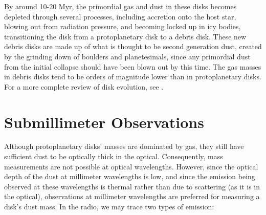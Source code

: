 By around 10-20 Myr, the primordial gas and dust in these disks becomes depleted through several processes, including accretion onto the host star, blowing out from radiation pressure, and becoming locked up in icy bodies, transitioning the disk from a protoplanetary disk to a debris disk. These new debris disks are made up of what is thought to be second generation dust, created by the grinding down of boulders and planetesimals, since any primordial dust from the initial collapse should have been blown out by this time. The gas masses in debris disks tend to be orders of magnitude lower than in protoplanetary disks. For a more complete review of disk evolution, see \citet{Hughes2018}.




\section{Submillimeter Observations}

Although protoplanetary disks' masses are dominated by gas, they still have sufficient dust to be optically thick in the optical. Consequently, mass measurements are not possible at optical wavelengths. However, since the optical depth of the dust at millimeter wavelengths is low, and since the emission being observed at these wavelengths is thermal rather than due to scattering (as it is in the optical), observations at millimeter wavelengths are preferred for measuring a disk's dust mass. In the radio, we may trace two types of emission:

